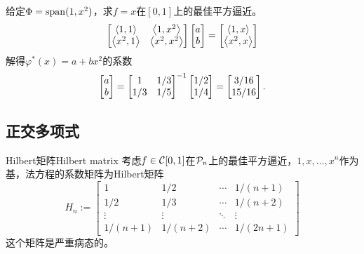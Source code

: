 \begin{example}
    {}{}
    给定$\Phi=\operatorname{span}(1,x^2)$，求$f=x$在$[0,1]$上的最佳平方逼近。
    \[
        \begin{bmatrix}
            \left\langle 1,1\right\rangle&\left\langle 1,x^2\right\rangle\\
            \left\langle x^2,1\right\rangle&\left\langle x^2,x^2\right\rangle
        \end{bmatrix}\begin{bmatrix}
            a\\b
        \end{bmatrix}=\begin{bmatrix}
            \left\langle 1,x\right\rangle\\\left\langle x^2,x\right\rangle
        \end{bmatrix}
    \]
    解得$\varphi^*(x)=a+bx^2$的系数
    \[
        \begin{bmatrix}
            a\\b
        \end{bmatrix}=\begin{bmatrix}
            1&1/3\\1/3&1/5
        \end{bmatrix}^{-1}\begin{bmatrix}
            1/2\\1/4
        \end{bmatrix}=\begin{bmatrix}
            3/16\\15/16
        \end{bmatrix}.
    \]
\end{example}

\subsection{正交多项式}

\begin{definition}
    {Hilbert矩阵}{Hilbert matrix}
    考虑$f\in\mathcal C[0,1]$在$\mathcal P_n$上的最佳平方逼近，$1,x,\ldots,x^n$作为基，法方程的系数矩阵为Hilbert矩阵
    \begin{equation}
        H_n:=\begin{bmatrix}
            1&1/2&\cdots&1/(n+1)\\
            1/2&1/3&\cdots&1/(n+2)\\
            \vdots&\vdots&\ddots&\vdots\\
            1/(n+1)&1/(n+2)&\cdots&1/(2n+1)
        \end{bmatrix}
    \end{equation}
    这个矩阵是严重病态的。
\end{definition}


